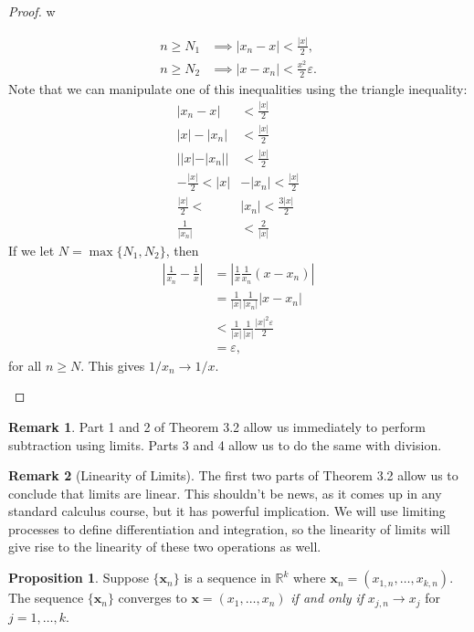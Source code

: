 \documentclass{article}
\newcommand{\R}{\mathbb{R}}
\newcommand{\x}{\mathbf{x}}
\theoremstyle{definition}
\newtheorem{proposition}{Proposition}[section]
\newtheorem{remark}{Remark}[section]
\begin{document}
\begin{proof}{\color{white}w}
\begin{enumerate}
\begin{align*}
				n\ge N_1&\implies |x_n-x|<\frac{|x|}{2},\\
				n\ge N_2&\implies |x-x_n|<\frac{x^2}{2}\varepsilon.
			\end{align*}  
			Note that we can manipulate one of this inequalities using the triangle inequality:
			\begin{align*}
				|x_n-x|&<\frac{|x|}{2}\\
				|x|-|x_n|&<\frac{|x|}{2}\\
				||x|-|x_n||&<\frac{|x|}{2}\\
				-\frac{|x|}{2}<|x|&-|x_n|<\frac{|x|}{2}\\
				\frac{|x|}{2}<&|x_n|<\frac{3|x|}{2}\\ \frac{1}{|x_n|}&<\frac{2}{|x|}
			\end{align*}
			If we let $ N=\max\{N_1,N_2\} $, then
			\begin{align*}
				\left\lvert\frac{1}{x_n}-\frac{1}{x}\right\rvert &=\left\lvert\frac{1}{x}\frac{1}{x_n}(x-x_n) \right\rvert\\
				&=\frac{1}{|x|}\frac{1}{|x_n|}|x-x_n|\\&<\frac{1}{|x|}\frac{1}{|x|}\frac{|x|^2\varepsilon}{2}
				\\&=\varepsilon,
			\end{align*}
			for all $ n\ge N $. This gives $ 1/x_n\to 1/x $. 
		\end{enumerate}
	\end{proof}
	\begin{remark}
		Part 1 and 2 of Theorem 3.2  allow us immediately to perform subtraction using limits. Parts 3 and 4 allow us to do the same with division. 
	\end{remark}
	\begin{remark}[Linearity of Limits]
		The first two parts of Theorem 3.2 allow us to conclude that limits are linear. This shouldn't be news, as it comes up in any standard calculus course, but it has powerful implication. We will use limiting processes to define differentiation and integration, so the linearity of limits will give rise to the linearity of these two operations as well.
	\end{remark}
	\begin{proposition}
		Suppose $ \{\x_n\} $ is a sequence in $ \R^k $ where $ \x_n=(x_{1,n},\ldots,x_{k,n}) $. The sequence $ \{\x_n\} $ converges to $ \x=(x_1,\ldots, x_n) $ \textit{if and only if} $ x_{j,n}\to x_j $ for $ j=1,\ldots,k $.  
	\end{proposition}
\end{document}
